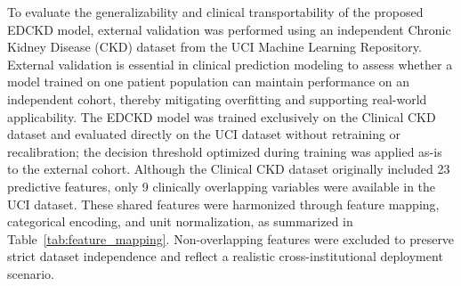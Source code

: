 \begin{table}[ht]
\centering
\caption{Performance of the proposed EDCKD model on the external validation dataset using the training-optimized threshold.}
\label{tab:external_validation_metrics}
\end{table}

To evaluate the generalizability and clinical transportability of the proposed EDCKD model, external validation was performed using an independent Chronic Kidney Disease (CKD) dataset from the UCI Machine Learning Repository. External validation is essential in clinical prediction modeling to assess whether a model trained on one patient population can maintain performance on an independent cohort, thereby mitigating overfitting and supporting real-world applicability. The EDCKD model was trained exclusively on the Clinical CKD dataset and evaluated directly on the UCI dataset without retraining or recalibration; the decision threshold optimized during training was applied as-is to the external cohort. Although the Clinical CKD dataset originally included 23 predictive features, only 9 clinically overlapping variables were available in the UCI dataset. These shared features were harmonized through feature mapping, categorical encoding, and unit normalization, as summarized in Table~\ref{tab:feature_mapping}. Non-overlapping features were excluded to preserve strict dataset independence and reflect a realistic cross-institutional deployment scenario.

